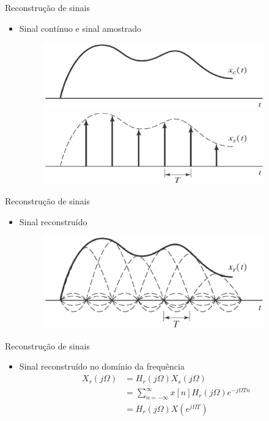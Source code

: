 \begin{slide}{Reconstru\c c\~ao de sinais}
\begin{itemize}
   \item Sinal cont\'inuo e sinal amostrado
   \begin{figure}
      \centering
      \includegraphics[width=0.9\textwidth]{figs/reconstr02a.eps}
      \includegraphics[width=0.9\textwidth]{figs/reconstr02b.eps}
   \end{figure}
\end{itemize}
\end{slide}

\begin{slide}{Reconstru\c c\~ao de sinais}
\begin{itemize}
   \item Sinal reconstru\'ido
   \begin{figure}
      \centering
      \includegraphics[width=0.9\textwidth]{figs/reconstr03.eps}
   \end{figure}
\end{itemize}
\end{slide}

\begin{slide}{Reconstru\c c\~ao de sinais}
\begin{itemize}
   \item Sinal reconstru\'ido no dom\'inio da frequ\^encia 
   \begin{align}
      X_r(j\Omega) &= H_r(j\Omega)X_s(j\Omega)\\
                   &= \sum_{n=-\infty}^{\infty}x[n]H_r(j\Omega)e^{-j\Omega Tn}\\
                   &= H_r(j\Omega)X(e^{j\Omega T})             
   \end{align}
\end{itemize}
\end{slide}


